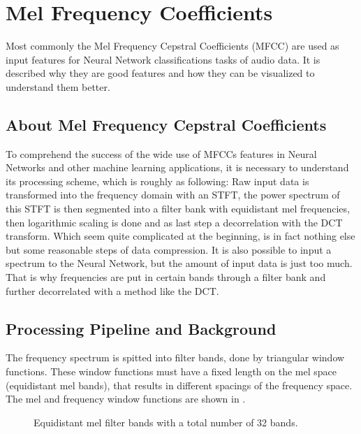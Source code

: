 
\section{Mel Frequency Coefficients}\label{sec:signal_mfcc}
Most commonly the Mel Frequency Cepstral Coefficients (MFCC) are used as input features for Neural Network classifications tasks of audio data.
It is described why they are good features and how they can be visualized to understand them better.

\subsection{About Mel Frequency Cepstral Coefficients}
To comprehend the success of the wide use of MFCCs features in Neural Networks and other machine learning applications, it is necessary to understand its processing scheme, which is roughly as following: 
Raw input data is transformed into the frequency domain with an STFT, the power spectrum of this STFT is then segmented into a filter bank with equidistant mel frequencies, then logarithmic scaling is done and as last step a decorrelation with the DCT transform.
Which seem quite complicated at the beginning, is in fact nothing else but some reasonable steps of data compression. 
It is also possible to input a spectrum to the Neural Network, but the amount of input data is just too much.
That is why frequencies are put in certain bands through a filter bank and further decorrelated with a method like the DCT.

\subsection{Processing Pipeline and Background}
The frequency spectrum is spitted into filter bands, done by triangular window functions.
These window functions must have a fixed length on the mel space (equidistant mel bands), that results in different spacings of
the frequency space. The mel and frequency window functions are shown in .
\begin{figure}[!ht]
  \centering
  \quad
  \caption{Equidistant mel filter bands with a total number of 32 bands.}
  \label{fig:filter_bands}
\end{figure}
\FloatBarrier
\noindent

